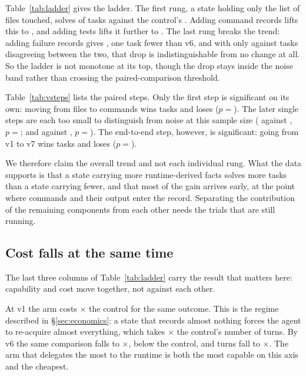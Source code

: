 

Table~\ref{tab:ladder} gives the ladder. The first rung, a state holding only
the list of files touched, solves \VRateVOne{} of tasks against the
control's \VBaseRate. Adding command records lifts this to \VRateVThree, and
adding tests lifts it further to \VRateVSix. The last rung breaks the trend:
adding failure records gives \VRateVSeven, one task fewer than v6, and with
only \VStepVSixVSevenLo{} against \VStepVSixVSevenHi{} tasks disagreeing
between the two, that drop is indistinguishable from no change at all. So the
ladder is not monotone at its top, though the drop stays inside the noise
band rather than crossing the paired-comparison threshold.

Table~\ref{tab:vsteps} lists the paired steps. Only the first step is
significant on its own: moving from files to commands wins
\VStepVOneVThreeHi{} tasks and loses \VStepVOneVThreeLo{}
($p={}$\VStepVOneVThreeP). The later single steps are each too small to
distinguish from noise at this sample size (\VStepVThreeVSixLo{} against
\VStepVThreeVSixHi{}, $p={}$\VStepVThreeVSixP; and \VStepVSixVSevenLo{}
against \VStepVSixVSevenHi, $p={}$\VStepVSixVSevenP). The end-to-end step,
however, is significant: going from v1 to v7 wins \VStepVOneVSevenHi{} tasks
and loses \VStepVOneVSevenLo{} ($p={}$\VStepVOneVSevenP).

We therefore claim the overall trend and not each individual rung. What the
data supports is that a state carrying more runtime-derived facts solves more
tasks than a state carrying fewer, and that most of the gain arrives early,
at the point where commands and their output enter the record. Separating the
contribution of the remaining components from each other needs the trials
that are still running.

\begin{table}[t]
\centering
\caption{Paired steps along the ladder, same task and trial.}
\label{tab:vsteps}

\end{table}

\subsection{Cost falls at the same time}

The last three columns of Table~\ref{tab:ladder} carry the result that
matters here: capability and cost move together, not against each other.

At v1 the arm costs \VCostVOne$\times$ the control for the same outcome. This
is the regime described in \S\ref{sec:economics}: a state that records almost
nothing forces the agent to re-acquire almost everything, which takes
\VTurnsVOne$\times$ the control's number of turns. By v6 the same comparison
falls to \VCostVSix$\times$, below the control, and turns fall to
\VTurnsVSix$\times$. The arm that delegates the most to the runtime is both
the most capable on this axis and the cheapest.

